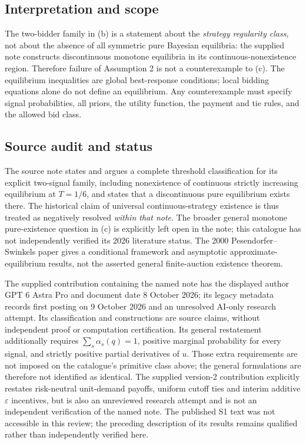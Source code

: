 \documentclass[11pt,a4paper]{article}
\begin{document}
\subsection*{Interpretation and scope}

The two-bidder family in (b) is a statement about the \emph{strategy
	regularity class}, not about the absence of all symmetric pure
Bayesian equilibria: the supplied note constructs discontinuous
monotone equilibria in its continuous-nonexistence region. Therefore
failure of Assumption 2 is not a counterexample to (c).
The equilibrium inequalities are global best-response conditions;
local bidding equations alone do not define an equilibrium. Any
counterexample must specify signal probabilities, all priors, the
utility function, the payment and tie rules, and the allowed bid class.

\subsection*{Source audit and status}

The source note states and argues a complete threshold classification
for its explicit two-signal family, including nonexistence of
continuous strictly increasing equilibrium at $T=1/6$, and states
that a discontinuous pure equilibrium exists there. The historical
claim of universal continuous-strategy existence is thus treated as
negatively resolved \emph{within that note}. The broader general
monotone pure-existence question in (c) is explicitly left open in the
note; this catalogue has not independently verified its 2026
literature status. The 2000 Pesendorfer--Swinkels paper gives a
conditional framework and asymptotic approximate-equilibrium results,
not the asserted general finite-auction existence theorem.

The supplied contribution containing the named note has the displayed
author GPT 6 Astra Pro and document date 8 October 2026; its legacy
metadata records first posting on 9 October 2026 and an unresolved
AI-only research attempt. Its classification and constructions are
source claims, without independent proof or computation certification.
Its general restatement additionally requires
$\sum_s\alpha_s(q)=1$, positive marginal probability for every signal,
and strictly positive partial derivatives of $u$. Those extra
requirements are not imposed on the catalogue's primitive class above;
the general formulations are therefore not identified as identical.
The supplied version-2 contribution explicitly restates risk-neutral
unit-demand payoffs, uniform cutoff ties and interim additive
$\varepsilon$ incentives, but is also an unreviewed research attempt
and is not an independent verification of the named note.
The published S1 text was not accessible in this review; the preceding
description of its results remains qualified rather than independently
verified here.
\end{document}
